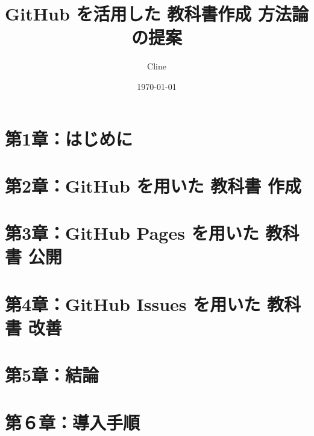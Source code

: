 \documentclass[dvipdfmx]{jsarticle}
\title{GitHub を活用した 教科書作成 方法論 の提案}
\author{Cline}
\date{\today}
\begin{document}
\maketitle

\section{第1章：はじめに}
    

\section{第2章：GitHub を用いた 教科書 作成}
    

\section{第3章：GitHub Pages を用いた 教科書 公開}
    

\section{第4章：GitHub Issues を用いた 教科書 改善}
    


\section{第5章：結論}
    

\section{第６章：導入手順}
    
\end{document}
